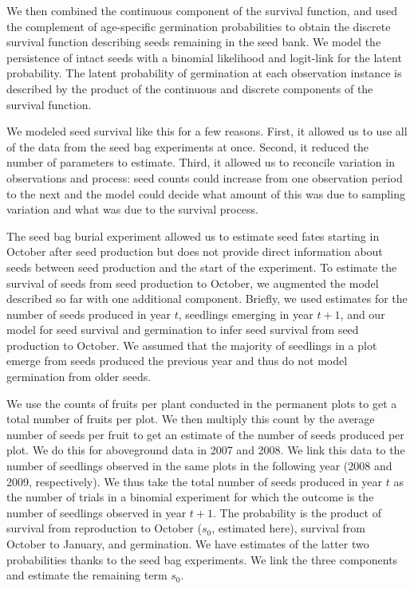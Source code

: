 \documentclass[12pt, oneside, titlepage]{article}   	%
\begin{document}
We then combined the continuous component of the survival function, and used the complement of age-specific germination probabilities to obtain the discrete survival function describing seeds remaining in the seed bank. We model the persistence of intact seeds with a binomial likelihood and logit-link for the latent probability. The latent probability of germination at each observation instance is described by the product of the continuous and discrete components of the survival function. 

We modeled seed survival like this for a few reasons. First, it allowed us to use all of the data from the seed bag experiments at once. Second, it reduced the number of parameters to estimate. Third, it allowed us to reconcile variation in observations and process: seed counts could increase from one observation period to the next and the model could decide what amount of this was due to sampling variation and what was due to the survival process. 

The seed bag burial experiment allowed us to estimate seed fates starting in October after seed production but does not provide direct information about seeds between seed production and the start of the experiment. To estimate the survival of seeds from seed production to October, we augmented the model described so far with one additional component. Briefly, we used estimates for the number of seeds produced in year $t$, seedlings emerging in year $t+1$, and our model for seed survival and germination to infer seed survival from seed production to October. We assumed that the majority of seedlings in a plot emerge from seeds produced the previous year and thus do not model germination from older seeds.

We use the counts of fruits per plant conducted in the permanent plots to get a total number of fruits per plot. We then multiply this count by the average number of seeds per fruit to get an estimate of the number of seeds produced per plot. We do this for aboveground data in 2007 and 2008. We link this data to the number of seedlings observed in the same plots in the following year (2008 and 2009, respectively). We thus take the total number of seeds produced in year $t$ as the number of trials in a binomial experiment for which the outcome is the number of seedlings observed in year $t+1$. The probability is the product of survival from reproduction to October ($s_0$, estimated here), survival from October to January, and germination. We have estimates of the latter two probabilities thanks to the seed bag experiments. We link the three components and estimate the remaining term $s_0$.
\end{document}
